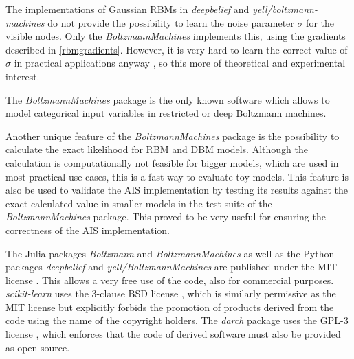 \documentclass[12pt]{article}
\newcommand{\apkg}[1]{\emph{#1}}
\begin{document}
The implementations of Gaussian RBMs in \apkg{deepbelief} and \apkg{yell/boltzmann-machines} do not provide the possibility to learn the noise parameter $\sigma$ for the visible nodes.
Only the \apkg{BoltzmannMachines} implements this, using the gradients described in \ref{rbmgradients}.
However, it is very hard to learn the correct value of $\sigma$ in practical applications anyway \citep{hinton_practical_2012}, so this more of theoretical and experimental interest.

The \apkg{BoltzmannMachines} package is the only known software which allows to model categorical input variables in restricted or deep Boltzmann machines.

Another unique feature of the \apkg{BoltzmannMachines} package is the possibility to calculate the exact likelihood for RBM and DBM models.
Although the calculation is computationally not feasible for bigger models, which are used in most practical use cases, this is a fast way to evaluate toy models.
This feature is also be used to validate the AIS implementation by testing its results against the exact calculated value in smaller models in the test suite of the \apkg{BoltzmannMachines} package.
This proved to be very useful for ensuring the correctness of the AIS implementation.


The Julia packages \apkg{Boltzmann} and \apkg{BoltzmannMachines} as well as the Python packages \apkg{deepbelief} and \apkg{yell/BoltzmannMachines} are published under the MIT license \citep{mitlicense}.
This allows a very free use of the code, also for commercial purposes.
\apkg{scikit-learn} uses the 3-clause BSD license \citep{bsd3}, which is similarly permissive as the MIT license but explicitly forbids the promotion of products derived from the code using the name of the copyright holders.
The \apkg{darch} package uses the GPL-3 license \citep{gplv3}, which enforces that the code of derived software must also be provided as open source.


\end{document}
